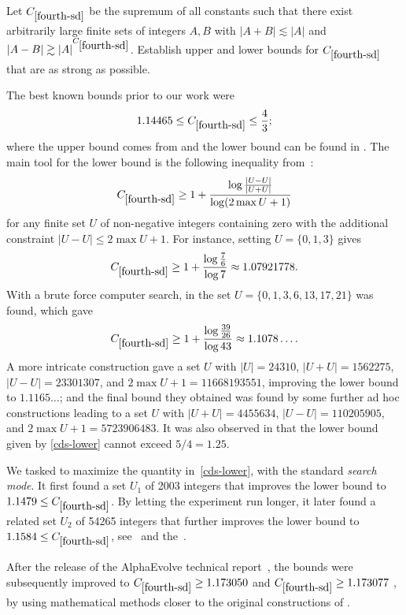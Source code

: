 \begin{problem}\label{fourth-sd} Let $C_{\ref{fourth-sd}}$ be the supremum of all constants such that 
there exist arbitrarily large finite sets of integers $A,B$ with $|A+B| \lesssim |A|$ and $|A-B| \gtrsim |A|^{C_{\ref{fourth-sd}}}$.
   Establish upper and lower bounds for $C_{\ref{fourth-sd}}$ that are as strong as possible.
\end{problem}

The best known bounds prior to our work were
\begin{equation}\label{cds}
 1.14465 \leq C_{\ref{fourth-sd}} \leq \frac{4}{3};
\end{equation}
where the upper bound comes from \cite[Corollary 3]{gyarmati} and the lower bound can be found in \cite[Theorem 1]{gyarmati}.  The main tool for the lower bound is the following inequality from~\cite{gyarmati}:
\begin{equation}\label{cds-lower}
 C_{\ref{fourth-sd}} \geq 1 + \frac{\log \frac{|U-U|}{|U+U|}}{\log (2 \max U + 1)}
\end{equation}
for any finite set $U$ of non-negative integers containing zero with the additional constraint $|U-U| \leq 2 \max U + 1$.  For instance, setting $U = \{0,1,3\}$ gives
$$C_{\ref{fourth-sd}} \geq 1 + \frac{\log \frac{7}{6}}{\log 7} \approx 1.07921778.$$
With a brute force computer search, in \cite{gyarmati} the set $U = \{0, 1, 3, 6, 13,
17, 21\}$ was found, which gave
$$C_{\ref{fourth-sd}} \geq 1 + \frac{\log \frac{39}{26}}{\log 43} \approx 1.1078\dots.$$
A more intricate construction gave a set $U$ with $|U| = 24310$, $|U+U| = 1562275$, $|U-U| = 23301307$, and $2\max U + 1 = 11668193551$, improving the lower bound to $1.1165\dots$; and the final bound they obtained was found by some further ad hoc constructions leading to a set $U$ with $|U+U| = 4455634$, $|U-U| = 110205905$, and $2 \max U + 1 = 5723906483$.  It was also observed in \cite{gyarmati} that the lower bound given by \eqref{cds-lower} cannot exceed $5/4 = 1.25$.

We tasked \AlphaEvolve to maximize the quantity in~\ref{cds-lower}, with the standard \emph{search mode}. It first found a set $U_1$ of 2003 integers that improves the lower bound to $1.1479 \leq C_{\ref{fourth-sd}}$. By letting the experiment run longer, it later found a related set $U_2$ of 54265 integers that further improves the lower bound to $1.1584 \leq C_{\ref{fourth-sd}}$, see~\cite{AEcolab} and the~\Repo.


After  the release of the AlphaEvolve technical report~\cite{novikov2025alphaevolve}, the bounds were subsequently improved to 
$C_{\ref{fourth-sd}} \geq 1.173050$
\cite{gerbicz2025sums} and $C_{\ref{fourth-sd}} \geq 1.173077$  \cite{zheng2025sums}, by using mathematical methods closer to the original constructions of \cite{gyarmati}.


